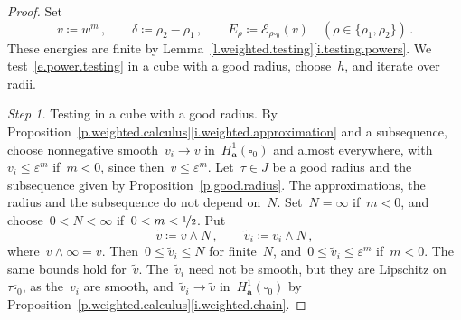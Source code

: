 \documentclass[11pt,letterpaper]{article}
\numberwithin{equation}{section}
\theoremstyle{definition}
\renewcommand{\a}{\mathbf{a}}
\newcommand{\eps}{\varepsilon}
\newcommand{\nf}{\nicefrac}
\newcommand{\cu}{\square}
\newcommand{\Ener}{\mathcal E}
\begin{document}
\begin{proof}
Set
\begin{equation*}
	v\coloneqq w^m\,,\qquad\delta\coloneqq\rho_2-\rho_1\,,\qquad E_\rho\coloneqq\Ener_{\rho\cu_0}(v)\quad(\rho\in\{\rho_1,\rho_2\})\,.
\end{equation*}
These energies are finite by Lemma~\ref{l.weighted.testing}\ref{i.testing.powers}. We test~\eqref{e.power.testing} in a cube with a good radius, choose~$h$, and iterate over radii.

\smallskip

\emph{Step 1.} Testing in a cube with a good radius. By Proposition~\ref{p.weighted.calculus}\ref{i.weighted.approximation} and a subsequence, choose nonnegative smooth~$v_i\to v$ in~$H^1_\a(\cu_0)$ and almost everywhere, with~$v_i\leq\eps^m$ if~$m<0$, since then~$v\leq\eps^m$. Let~$\tau\in J$ be a good radius and the subsequence given by Proposition~\ref{p.good.radius}. The approximations, the radius and the subsequence do not depend on~$N$. Set~$N=\infty$ if~$m<0$, and choose~$0<N<\infty$ if~$0<m<\nf12$. Put
\begin{equation*}
	\tilde v\coloneqq v\wedge N\,,\qquad\tilde v_i\coloneqq v_i\wedge N\,,
\end{equation*}
where~$v\wedge\infty=v$. Then~$0\leq\tilde v_i\leq N$ for finite~$N$, and~$0\leq\tilde v_i\leq\eps^m$ if~$m<0$. The same bounds hold for~$\tilde v$. The~$\tilde v_i$ need not be smooth, but they are Lipschitz on~$\tau\overline{\cu}_0$, as the~$v_i$ are smooth, and~$\tilde v_i\to\tilde v$ in~$H^1_\a(\cu_0)$ by Proposition~\ref{p.weighted.calculus}\ref{i.weighted.chain}.


\end{proof}
\end{document}
